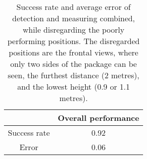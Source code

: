 \begin{table}%
\centering
\begin{tabular}{@{} *2c @{}}
\toprule
 & {Overall performance}\\ 
\midrule
Success rate	& 0.92 \\ 
Error 			& 0.06 \\
\bottomrule 
 \end{tabular}
 \caption[Improved overall success rate and average error of the system, when some positions are disregarded]{Success rate and average error of detection and measuring combined, while disregarding the poorly performing positions. The disregarded positions are the frontal views, where only two sides of the package can be seen, the furthest distance (2 metres), and the lowest height (0.9 or 1.1 metres). }
\label{table:overall_good}
\end{table}